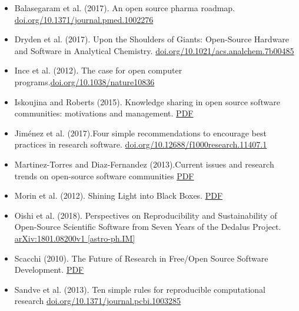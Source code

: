 \documentclass{article}
\begin{document}
\begin{itemize}
\item Balasegaram et al. (2017). An open source pharma roadmap. \href{https://doi.org/10.1371/journal.pmed.1002276}{doi.org/10.1371/journal.pmed.1002276}


\item Dryden et al. (2017). Upon the Shoulders of Giants: Open-Source Hardware and Software in Analytical Chemistry. \href{https://pubs.acs.org/doi/abs/10.1021/acs.analchem.7b00485}{doi.org/10.1021/acs.analchem.7b00485}


\item Ince et al. (2012). The case for open computer programs.\href{https://doi.org/10.1038/nature10836}{doi.org/10.1038/nature10836}


\item Iskoujina and Roberts (2015). Knowledge sharing in open source software communities: motivations and management. \href{https://pdfs.semanticscholar.org/f2a2/c5129cf5656af7acc7ffaf84c9c9bafe72c5.pdf}{PDF}


\item Jiménez et al. (2017).Four simple recommendations to encourage best practices in research software. \href{https://doi.org/10.12688/f1000research.11407.1}{doi.org/10.12688/f1000research.11407.1}


\item Martinez-Torres and Diaz-Fernandez (2013).Current issues and research trends on open-source software communities \href{https://idus.us.es/xmlui/bitstream/handle/11441/32245/Current%20issues%20and%20research%20trends.pdf?sequence=1}{PDF}


\item Morin et al. (2012). Shining Light into Black Boxes. \href{https://www.ncbi.nlm.nih.gov/pmc/articles/PMC4203337/pdf/nihms588981.pdf}{PDF}


\item Oishi et al. (2018). Perspectives on Reproducibility and Sustainability of Open-Source Scientific Software from Seven Years of the Dedalus Project. \href{https://arxiv.org/abs/1801.08200}{arXiv:1801.08200v1 [astro-ph.IM]}


\item Scacchi (2010). The Future of Research in Free/Open Source Software Development. \href{http://www.ics.uci.edu/~wscacchi/Papers/New/FoSER-Scacchi-2010.pdf}{PDF}


\item Sandve et al. (2013). Ten simple rules for reproducible computational research \href{https://doi.org/10.1371/journal.pcbi.1003285}{doi.org/10.1371/journal.pcbi.1003285}



\end{itemize}
\end{document}
